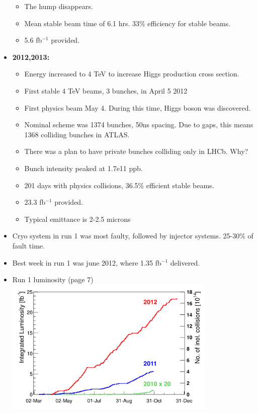 \begin{itemize}
\begin{itemize}
        \item The hump disappears. \cite{lhcRun1}
        \item Mean stable beam time of 6.1 hrs. 33\% efficiency for stable beams. \cite{lhcRun1}
        \item 5.6 fb$^{-1}$ provided. \cite{lhcRun1}
    \end{itemize}
    \item \textbf{2012,2013:} \cite{lhcRun1}
    \begin{itemize}
        \item Energy increased to 4 TeV to increase Higgs production cross section. \cite{lhcRun1}
        \item First stable 4 TeV beams, 3 bunches, in April 5 2012 \cite{lhcRun1}
        \item First physics beam May 4. During this time, Higgs boson was discovered. \cite{lhcRun1}
        \item Nominal scheme was 1374 bunches, 50ns spacing. Due to gaps, this means 1368 colliding bunches in ATLAS. \cite{lhcRun1}
        \item There was a plan to have private bunches colliding only in LHCb. {\color{blue}Why?} \cite{lhcRun1}
        \item Bunch intensity peaked at 1.7e11 ppb. \cite{lhcRun1}
        \item 201 days with physics collisions, 36.5\% efficient stable beams. \cite{lhcRun1}
        \item 23.3 fb$^{-1}$ provided. \cite{lhcRun1}
        \item Typical emittance is 2-2.5 microns \cite{lhcRun1}
    \end{itemize}
    \item Cryo system in run 1 was most faulty, followed by injector systems. 25-30\% of fault time. \cite{lhcRun1}
    \item Best week in run 1 was june 2012, where 1.35 fb$^{-1}$ delivered. \cite{lhcRun1}
    \item Run 1 luminosity (page 7)\\ \cite{lhcRun1}
    \includegraphics[width=0.8\textwidth]{figures/experiment/run1Lumi.png}

\end{itemize}
